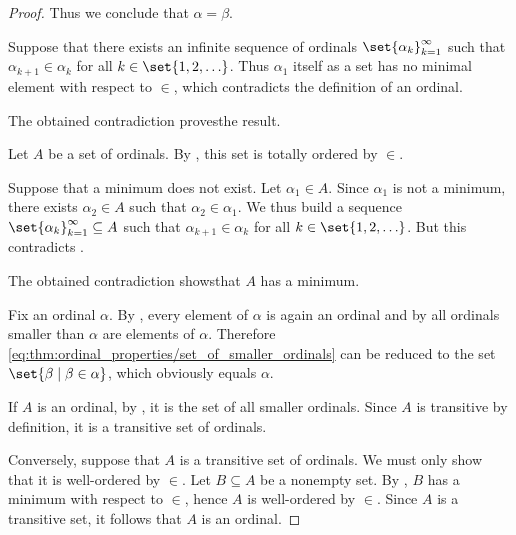 \begin{proof}
  Thus we conclude that \( \alpha = \beta \).

   Suppose that there exists an infinite sequence of ordinals \( \set{ \alpha_k }_{k=1}^\infty \) such that \( \alpha_{k+1} \in \alpha_k \) for all \( k \in \set{ 1, 2, \ldots } \). Thus \( \alpha_1 \) itself as a set has no minimal element with respect to \( \in \), which contradicts the definition of an ordinal.

  The obtained contradiction proves\DNE the result.

   Let \( A \) be a set of ordinals. By , this set is totally ordered by \( \in \).

  Suppose that a minimum does not exist. Let \( \alpha_1 \in A \). Since \( \alpha_1 \) is not a minimum, there exists \( \alpha_2 \in A \) such that \( \alpha_2 \in \alpha_1 \). We thus build a sequence \( \set{ \alpha_k }_{k=1}^\infty \subseteq A \) such that \( \alpha_{k+1} \in \alpha_k \) for all \( k \in \set{ 1, 2, \ldots } \). But this contradicts .

  The obtained contradiction shows\DNE that \( A \) has a minimum.

   Fix an ordinal \( \alpha \). By , every element of \( \alpha \) is again an ordinal and by  all ordinals smaller than \( \alpha \) are elements of \( \alpha \). Therefore \eqref{eq:thm:ordinal_properties/set_of_smaller_ordinals} can be reduced to the set \( \set{ \beta \given \beta \in \alpha } \), which obviously equals \( \alpha \).

   If \( A \) is an ordinal, by , it is the set of all smaller ordinals. Since \( A \) is transitive by definition, it is a transitive set of ordinals.

  Conversely, suppose that \( A \) is a transitive set of ordinals. We must only show that it is well-ordered by \( \in \). Let \( B \subseteq A \) be a nonempty set. By , \( B \) has a minimum with respect to \( \in \), hence \( A \) is well-ordered by \( \in \). Since \( A \) is a transitive set, it follows that \( A \) is an ordinal.
\end{proof}

